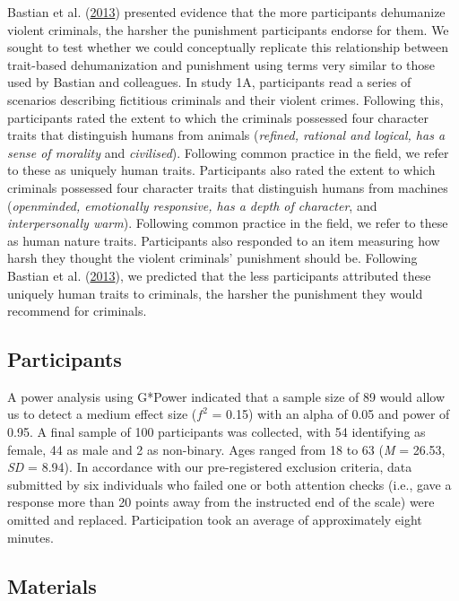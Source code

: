 \documentclass[
]{article}
\begin{document}
Bastian et al. (\protect\hyperlink{ref-Bastian2013}{2013}) presented evidence that the more participants dehumanize violent criminals, the harsher the punishment participants endorse for them. We sought to test whether we could conceptually replicate this relationship between trait-based dehumanization and punishment using terms very similar to those used by Bastian and colleagues. In study 1A, participants read a series of scenarios describing fictitious criminals and their violent crimes. Following this, participants rated the extent to which the criminals possessed four character traits that distinguish humans from animals (\emph{refined, rational and logical, has a sense of morality} and \emph{civilised}). Following common practice in the field, we refer to these as uniquely human traits. Participants also rated the extent to which criminals possessed four character traits that distinguish humans from machines (\emph{openminded, emotionally responsive, has a depth of character}, and \emph{interpersonally warm}). Following common practice in the field, we refer to these as human nature traits. Participants also responded to an item measuring how harsh they thought the violent criminals' punishment should be. Following Bastian et al. (\protect\hyperlink{ref-Bastian2013}{2013}), we predicted that the less participants attributed these uniquely human traits to criminals, the harsher the punishment they would recommend for criminals.

\hypertarget{participants}{%
\subsection{Participants}\label{participants}}

A power analysis using G*Power indicated that a sample size of 89 would allow us to detect a medium effect size (\(f^2\) = 0.15) with an alpha of 0.05 and power of 0.95. A final sample of 100 participants was collected, with 54 identifying as female, 44 as male and 2 as non-binary. Ages ranged from 18 to 63 (\emph{M} = 26.53, \emph{SD} = 8.94). In accordance with our pre-registered exclusion criteria, data submitted by six individuals who failed one or both attention checks (i.e., gave a response more than 20 points away from the instructed end of the scale) were omitted and replaced. Participation took an average of approximately eight minutes.

\hypertarget{materials}{%
\subsection{Materials}\label{materials}}
\end{document}
